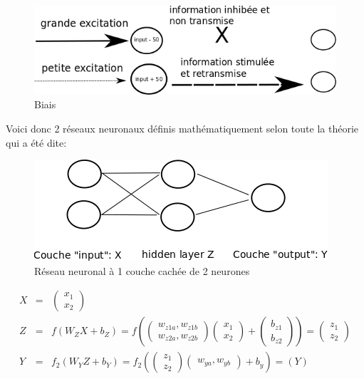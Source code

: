 \documentclass[11pt,a4paper]{report}
\begin{document}
    \begin{figure}[!h]
    \center
    \includegraphics[scale=0.74]{ressources/nn_theory_6.png}
    \caption{Biais}
    \end{figure} 
    

    
    \par Voici donc 2 réseaux neuronaux définis mathématiquement selon toute la théorie qui a été dite: 
    
    \begin{figure}[!h]
    \center
    \includegraphics[scale=0.74]{ressources/nn_presentation_4.png}
    \caption{Réseau neuronal à 1 couche cachée de 2 neurones}
    \end{figure} 
    
    \begin{eqnarray}
    X &=& \begin{pmatrix} x_1 \\ x_2  \end{pmatrix}     \\
    Z &=& f\left(W_ZX+b_Z\right) = f\left(\begin{pmatrix} w_{z1a}, w_{z1b} \\ w_{z2a}, w_{z2b}\end{pmatrix}\begin{pmatrix} x_1 \\ x_2  \end{pmatrix}+\begin{pmatrix} b_{z1} \\ b_{z2}  \end{pmatrix}\right) =  \begin{pmatrix} z_1 \\ z_2  \end{pmatrix} \\
    Y &=& f_2\left( W_YZ+b_Y \right) = f_2\left( \begin{pmatrix} z_1 \\ z_2  \end{pmatrix} \begin{pmatrix} w_{ya} , w_{yb} \end{pmatrix} + b_y \right)  = (Y)
    \end{eqnarray}
    
\end{document}
